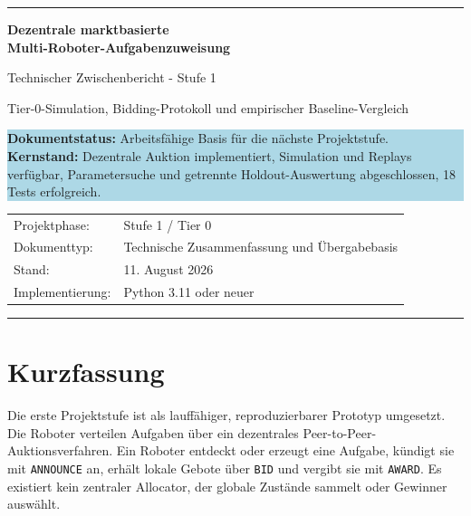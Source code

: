 \documentclass[11pt,a4paper]{article}
\newcommand{\statusbox}[1]{%
  \begin{center}
    \colorbox{lightblue}{\parbox{0.92\linewidth}{#1}}
  \end{center}
}
\begin{document}
\hypersetup{pageanchor=false}
\begin{titlepage}
  \thispagestyle{empty}
  \vspace*{1.4cm}
  {\color{projectteal}\rule{\textwidth}{3pt}}

  \vspace{1.2cm}
  {\Huge\bfseries\color{projectblue}
    Dezentrale marktbasierte\\[0.25em]
    Multi-Roboter-Aufgabenzuweisung\par}

  \vspace{0.7cm}
  {\LARGE Technischer Zwischenbericht - Stufe 1\par}

  \vspace{0.45cm}
  {\large Tier-0-Simulation, Bidding-Protokoll und empirischer Baseline-Vergleich\par}

  \vfill

  \statusbox{
    \textbf{Dokumentstatus:} Arbeitsfähige Basis für die nächste Projektstufe.\\[0.35em]
    \textbf{Kernstand:} Dezentrale Auktion implementiert, Simulation und Replays verfügbar,
    Parametersuche und getrennte Holdout-Auswertung abgeschlossen, 18 Tests erfolgreich.
  }

  \vfill
  \begin{tabular}{@{}ll@{}}
    Projektphase: & Stufe 1 / Tier 0\\
    Dokumenttyp: & Technische Zusammenfassung und Übergabebasis\\
    Stand: & 11. August 2026\\
    Implementierung: & Python 3.11 oder neuer
  \end{tabular}

  \vspace{1.2cm}
  {\color{projectteal}\rule{\textwidth}{3pt}}
\end{titlepage}

\hypersetup{pageanchor=true}
\begingroup
\small
\setlength{\parskip}{0pt}
\tableofcontents
\endgroup
\clearpage
{}

\section{Kurzfassung}

Die erste Projektstufe ist als lauffähiger, reproduzierbarer Prototyp umgesetzt. Die
Roboter verteilen Aufgaben über ein dezentrales Peer-to-Peer-Auktionsverfahren. Ein
Roboter entdeckt oder erzeugt eine Aufgabe, kündigt sie mit \texttt{ANNOUNCE} an,
erhält lokale Gebote über \texttt{BID} und vergibt sie mit \texttt{AWARD}. Es existiert
kein zentraler Allocator, der globale Zustände sammelt oder Gewinner auswählt.
\end{document}
